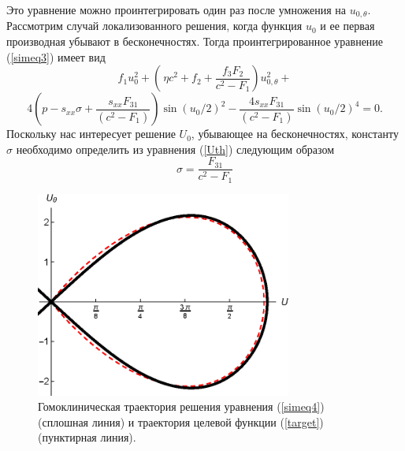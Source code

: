 Это уравнение можно проинтегрировать один раз после умножения на $u_{0, \theta}$. Рассмотрим случай локализованного решения, когда функция $u_0$ и ее первая производная убывают в бесконечностях. Тогда проинтегрированное уравнение (\ref{simeq3}) имеет вид
\[
f_1 u_0^2+\left(\frac{}{}\eta c^2+ f_2+\frac{f_3 F_2}{c^2-F_1}\right) u_{0,\theta}^2+ 
\]
\begin{equation}
	4 (p-s_{xx} \sigma+\frac{s_{xx} F_{31}}{(c^2-F_1)}) \sin(u_0/2)^2-\frac{4s_{xx} F_{31}}{(c^2-F_1)}\sin(u_0/2)^4=0.  \label{simeq4}
\end{equation}
Поскольку нас интересует решение $U_0$, убывающее на бесконечностях, константу $\sigma$ необходимо определить из уравнения (\ref{Uth}) следующим образом
\[
\sigma=\frac{F_{31}}{c^2-F_1}
\]
\begin{figure}
	\begin{center}
		\includegraphics[width=0.75\textwidth]{images/boundary_fig1.eps}
		\caption{Гомоклиническая траектория решения уравнения (\ref{simeq4}) (сплошная линия) и траектория целевой функции (\ref{target}) (пунктирная линия).}
		\label{bound_figure1}
	\end{center}
\end{figure}

